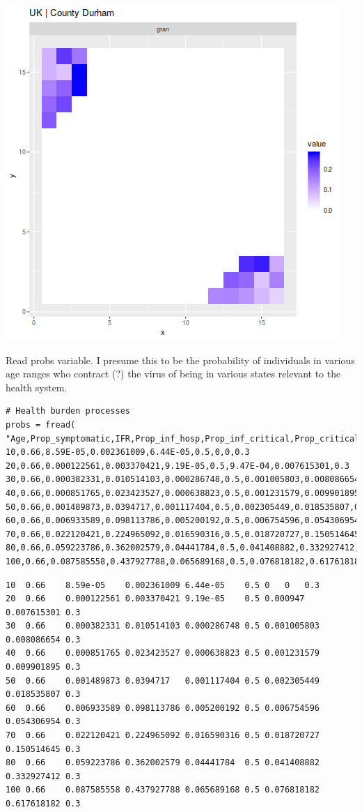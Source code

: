 \documentclass[11pt]{article}
\begin{document}
\begin{center}
\includegraphics[width=.9\linewidth]{1-home-parameters-after-split-and-gran.png}
\end{center}

Read probs variable. I presume this to be the probability of individuals in
various age ranges who contract (?) the virus of being in various states
relevant to the health system.

\begin{verbatim}
# Health burden processes
probs = fread(
"Age,Prop_symptomatic,IFR,Prop_inf_hosp,Prop_inf_critical,Prop_critical_fatal,Prop_noncritical_fatal,Prop_symp_hospitalised,Prop_hospitalised_critical
10,0.66,8.59E-05,0.002361009,6.44E-05,0.5,0,0,0.3
20,0.66,0.000122561,0.003370421,9.19E-05,0.5,9.47E-04,0.007615301,0.3
30,0.66,0.000382331,0.010514103,0.000286748,0.5,0.001005803,0.008086654,0.3
40,0.66,0.000851765,0.023423527,0.000638823,0.5,0.001231579,0.009901895,0.3
50,0.66,0.001489873,0.0394717,0.001117404,0.5,0.002305449,0.018535807,0.3
60,0.66,0.006933589,0.098113786,0.005200192,0.5,0.006754596,0.054306954,0.3
70,0.66,0.022120421,0.224965092,0.016590316,0.5,0.018720727,0.150514645,0.3
80,0.66,0.059223786,0.362002579,0.04441784,0.5,0.041408882,0.332927412,0.3
100,0.66,0.087585558,0.437927788,0.065689168,0.5,0.076818182,0.617618182,0.3")
\end{verbatim}

\begin{verbatim}
10	0.66	8.59e-05	0.002361009	6.44e-05	0.5	0	0	0.3
20	0.66	0.000122561	0.003370421	9.19e-05	0.5	0.000947	0.007615301	0.3
30	0.66	0.000382331	0.010514103	0.000286748	0.5	0.001005803	0.008086654	0.3
40	0.66	0.000851765	0.023423527	0.000638823	0.5	0.001231579	0.009901895	0.3
50	0.66	0.001489873	0.0394717	0.001117404	0.5	0.002305449	0.018535807	0.3
60	0.66	0.006933589	0.098113786	0.005200192	0.5	0.006754596	0.054306954	0.3
70	0.66	0.022120421	0.224965092	0.016590316	0.5	0.018720727	0.150514645	0.3
80	0.66	0.059223786	0.362002579	0.04441784	0.5	0.041408882	0.332927412	0.3
100	0.66	0.087585558	0.437927788	0.065689168	0.5	0.076818182	0.617618182	0.3
\end{verbatim}
\end{document}
